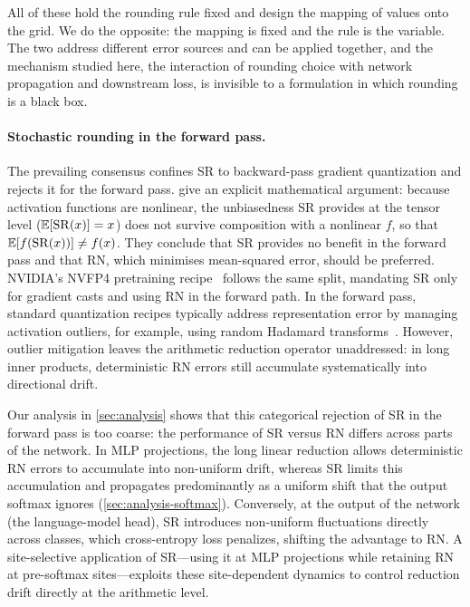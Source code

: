 All of these hold the rounding rule fixed and design the mapping of values onto
the grid. We do the opposite: the mapping is fixed and the rule is the
variable. The two address different error sources and can be applied together,
and the mechanism studied here, the interaction of rounding choice with
network propagation and downstream loss, is invisible to a formulation in which
rounding is a black box.

\paragraph{Stochastic rounding in the forward pass.}
The prevailing consensus confines SR to backward-pass gradient quantization and
rejects it for the forward pass. \citet{chmiel2023accurate} give
an explicit mathematical argument: because activation functions are nonlinear,
the unbiasedness SR provides at the tensor level
($\mathbb{E}[\mathrm{SR}(x)] = x$) does not survive composition with a nonlinear $f$, so that
$\mathbb{E}[f(\mathrm{SR}(x))] \neq f(x)$. They conclude that SR provides no benefit in the forward
pass and that RN, which minimises mean-squared error, should be preferred.
NVIDIA's NVFP4 pretraining recipe~\citep{nvidia2025nvfp4} follows the same
split, mandating SR only for gradient casts and using RN in the forward path.
In the forward pass, standard quantization recipes typically address
representation error by managing activation outliers, for example, using random
Hadamard transforms~\citep{ashkboos2024quarot,nvidia2025nvfp4}.  However,
outlier mitigation leaves the arithmetic reduction operator unaddressed: in
long inner products, deterministic RN errors still accumulate systematically
into directional drift.

Our analysis in \cref{sec:analysis} shows that this categorical rejection of SR
in the forward pass is too coarse: the performance of SR versus RN differs
across parts of the network.
In MLP projections, the long linear reduction allows deterministic RN errors
to accumulate into non-uniform drift, whereas SR limits this accumulation and
propagates predominantly as a uniform shift that the output softmax ignores
(\cref{sec:analysis-softmax}).
Conversely, at the output of the network (the language-model head), SR introduces
non-uniform fluctuations directly across classes, which cross-entropy loss
penalizes, shifting the advantage to RN.
A site-selective application of SR---using it at MLP projections while
retaining RN at pre-softmax sites---exploits these site-dependent dynamics
to control reduction drift directly at the arithmetic level.

